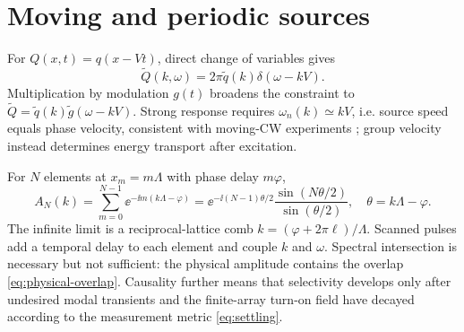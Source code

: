 \chapter{Moving and periodic sources}\label{ch:moving}
For $Q(x,t)=q(x-Vt)$, direct change of variables gives
\begin{equation}\widetilde Q(k,\omega)=2\pi\widetilde q(k)\delta(\omega-kV).
\label{eq:moving-spectrum}\end{equation}
Multiplication by modulation $g(t)$ broadens the constraint to
$\widetilde Q=\widetilde q(k)\widetilde g(\omega-kV)$. Strong response requires
$\omega_n(k)\simeq kV$, i.e. source speed equals phase velocity, consistent with
moving-CW experiments \cite{li2018}; group velocity instead determines energy
transport after excitation.

For $N$ elements at $x_m=m\Lambda$ with phase delay $m\varphi$,
\begin{equation}A_N(k)=\sum_{m=0}^{N-1}\ee^{-\ii m(k\Lambda-\varphi)}
=\ee^{-\ii(N-1)\theta/2}\frac{\sin(N\theta/2)}{\sin(\theta/2)},
\quad\theta=k\Lambda-\varphi.\label{eq:array-factor}\end{equation}
The infinite limit is a reciprocal-lattice comb
$k=(\varphi+2\pi\ell)/\Lambda$. Scanned pulses add a temporal delay to each
element and couple $k$ and $\omega$. Spectral intersection is necessary but not
sufficient: the physical amplitude contains the overlap
\cref{eq:physical-overlap}. Causality further means that selectivity develops
only after undesired modal transients and the finite-array turn-on field have
decayed according to the measurement metric \cref{eq:settling}.
